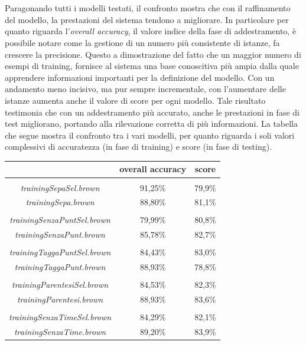 \documentclass[a4paper]{report}
\begin{document}
\\\\
Paragonando tutti i modelli testati, il confronto mostra che con il raffinamento del modello, la prestazioni del sistema tendono a migliorare. In particolare per quanto riguarda l'\textit{overall accuracy}, il valore indice della fase di addestramento, è possibile notare come la gestione di un numero più consistente di istanze, fa crescere la precisione. Questo a dimostrazione del fatto che un maggior numero di esempi di training, fornisce al sistema una base conoscitiva più ampia dalla quale apprendere informazioni importanti per la definizione del modello. Con un andamento meno incisivo, ma pur sempre incrementale, con l'aumentare delle istanze aumenta anche il valore di score per ogni modello. Tale risultato testimonia che con un addestramento più accurato, anche le prestazioni in fase di test migliorano, portando alla rilevazione corretta di più informazioni. La tabella che segue mostra il confronto tra i vari modelli, per quanto riguarda i soli valori complessivi di accuratezza (in fase di training) e score (in fase di testing).
\begin{center}
\begin{tabular}{|ccc|}
\hline
 & \textbf{overall accuracy} & \textbf{score}\\
\hline
 & &  \\
\hline
\textit{trainingSepaSel.brown} & 91,25\% & 79,9\% \\
\textit{trainingSepa.brown} & 88,80\% & 81,1\% \\
\hline
 & &  \\
\hline
\textit{trainingSenzaPuntSel.brown} & 79,99\% & 80,8\% \\
\textit{trainingSenzaPunt.brown} & 85,78\% & 82,7\% \\
\hline
 & &  \\
\hline
\textit{trainingTaggaPuntSel.brown} & 84,43\% & 83,0\% \\
\textit{trainingTaggaPunt.brown} & 88,93\% & 78,8\% \\
\hline
 & &  \\
\hline
\textit{trainingParentesiSel.brown} & 84,53\% &  82,3\% \\
\textit{trainingParentesi.brown} & 88,93\% & 83,6\% \\
\hline
 & &  \\
\hline
\textit{trainingSenzaTimeSel.brown} & 84,29\% & 82,1\% \\
\textit{trainingSenzaTime.brown} & 89,20\% & 83,9\% \\
\hline
\end{tabular}
\end{center}
\end{document}
